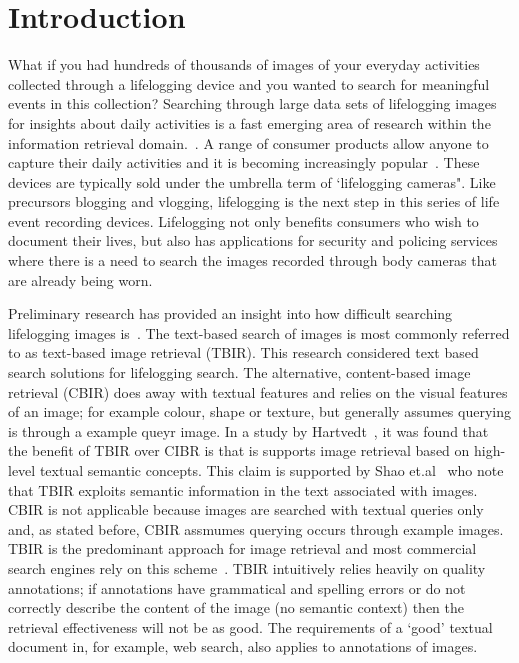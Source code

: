 \chapter{Introduction}

What if you had hundreds of thousands of images of your everyday activities collected through a lifelogging device and you wanted to search for meaningful events in this collection? Searching through large data sets of lifelogging images for insights about daily activities is a fast emerging area of research within the information retrieval domain.~\cite{gurrin2014lifelogging}. A range of consumer products allow anyone to capture their daily activities and it is becoming increasingly popular~\cite{gurrin2014lifelogging}\cite{van2014future}\cite{askoxylakis2011log}. These devices are typically sold under the umbrella term of `lifelogging cameras". Like precursors blogging and vlogging, lifelogging is the next step in this series of life event recording devices. Lifelogging not only benefits consumers who wish to document their lives, but also has applications for security and policing services where there is a need to search the images recorded through body cameras that are already being worn.

Preliminary research has provided an insight into how difficult searching lifelogging images is~\cite{scells2016qut}. The text-based search of images is most commonly referred to as text-based image retrieval (TBIR). This research considered text based search solutions for lifelogging search. The alternative, content-based image retrieval (CBIR) does away with textual features and relies on the visual features of an image; for example colour, shape or texture, but generally assumes querying is through a example queyr image. In a study by Hartvedt~\cite{hartvedt2010using}, it was found that the benefit of TBIR over CIBR is that is supports image retrieval based on high-level textual semantic concepts. This claim is supported by Shao et.al~\cite{medical2004shao} who note that TBIR exploits semantic information in the text associated with images. CBIR is not applicable because images are searched with textual queries only and, as stated before, CBIR assmumes querying occurs through example images. TBIR is the predominant approach for image retrieval and most commercial search engines rely on this scheme~\cite{escalante2007towards}. TBIR intuitively relies heavily on quality annotations; if annotations have grammatical and spelling errors or do not correctly describe the content of the image (no semantic context) then the retrieval effectiveness will not be as good. The requirements of a `good' textual document in, for example, web search, also applies to annotations of images.


